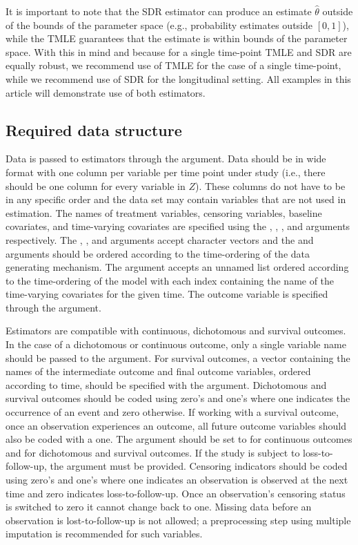 \documentclass[]{jss}
\begin{document}
It is important to note that the SDR estimator can produce an estimate
\(\hat{\theta}\) outside of the bounds of the parameter space
(e.g., probability estimates outside $[0,1]$), while the TMLE
guarantees that the estimate is within bounds of the parameter
space. With this in mind and because for a single time-point TMLE and
SDR are equally robust, we recommend use of TMLE for the case of a
single time-point, while we recommend use of SDR for the longitudinal
setting. All examples in this article will demonstrate use of both
estimators.

\hypertarget{required-data-structure}{%
\subsection{Required data structure}\label{required-data-structure}}

Data is passed to  estimators through the 
argument. Data should be in wide format with one column per variable
per time point under study (i.e., there should be one column for every
variable in \(Z\)). These columns do not have to be in any specific
order and the data set may contain variables that are not used in
estimation. The names of treatment variables, censoring variables,
baseline covariates, and time-varying covariates are specified using
the , , , and 
arguments respectively. The , , and
 arguments accept character vectors and the 
and  arguments should be ordered according to the
time-ordering of the data generating mechanism. The 
argument accepts an unnamed list ordered according to the
time-ordering of the model with each index containing the name of the
time-varying covariates for the given time. The outcome variable is
specified through the  argument.

Estimators are compatible with continuous, dichotomous and survival
outcomes. In the case of a dichotomous or continuous outcome, only a
single variable name should be passed to the 
argument. For survival outcomes, a vector containing the names of the
intermediate outcome and final outcome variables, ordered according to
time, should be specified with the 
argument. Dichotomous and survival outcomes should be coded using
zero's and one's where one indicates the occurrence of an event and
zero otherwise. If working with a survival outcome, once an
observation experiences an outcome, all future outcome variables
should also be coded with a one. The  argument
should be set to  for continuous outcomes and
 for dichotomous and survival outcomes. If the study
is subject to loss-to-follow-up, the  argument must be
provided. Censoring indicators should be coded using zero's and one's
where one indicates an observation is observed at the next time and
zero indicates loss-to-follow-up. Once an observation's censoring
status is switched to zero it cannot change back to one. Missing data
before an observation is lost-to-follow-up is not allowed; a
preprocessing step using multiple imputation is recommended for such
variables.
\end{document}
